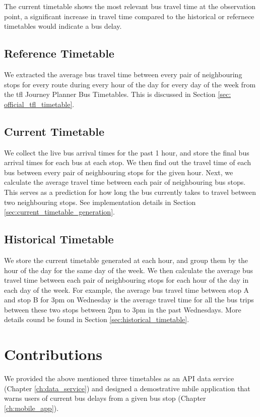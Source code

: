 \par The current timetable shows the most relevant bus travel time at the observation point, a significant increase in travel time compared to the historical or refernece timetables would indicate a bus delay.

\subsection{Reference Timetable}
\par We extracted the average bus travel time between every pair of neighbouring stops for every route during every hour of the day for every day of the week from the \acrshort{tfl} Journey Planner Bus Timetables. This is discussed in Section \ref{sec: official_tfl_timetable}.

\subsection{Current Timetable}
\par We collect the live bus arrival times for the past 1 hour, and store the final bus arrival times for each bus at each stop. We then find out the travel time of each bus between every pair of neighbouring stops for the given hour. Next, we calculate the average travel time between each pair of neighbouring bus stops. This serves as a prediction for how long the bus currently takes to travel between two neighbouring stops. See implementation details in Section \ref{sec:current_timetable_generation}.

\subsection{Historical Timetable}
\par We store the current timetable generated at each hour, and group them by the hour of the day for the same day of the week. We then calculate the average bus travel time between each pair of neighbouring stops for each hour of the day in each day of the week. For example, the average bus travel time between stop A and stop B for 3pm on Wednesday is the average travel time for all the bus trips between these two stops between 2pm to 3pm in the past Wednesdays. More details cound be found in Section \ref{sec:historical_timetable}.

\section{Contributions}
\par We provided the above mentioned three timetables as an API data service (Chapter \ref{ch:data_service}) and designed a demostrative mbile application that warns users of current bus delays from a given bus stop (Chapter \ref{ch:mobile_app}).





